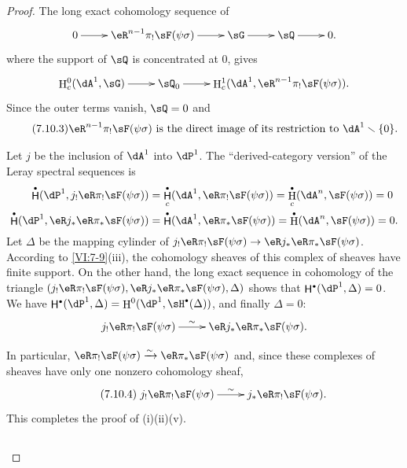 \documentclass[oneside]{book}
\DeclareMathOperator{\h}{H}
\DeclareMathOperator{\hh}{\mathsf{H}} %
\newcommand{\iso}{\xrightarrow\sim}
\renewcommand{\setminus}{\smallsetminus}
\theoremstyle{sga-source}
\theoremstyle{sga-source-dash}
\theoremstyle{sga-source-dotdash}
\theoremstyle{sga-source-number-note-dash}
\theoremstyle{sga-source-note-number-dotdash}
\theoremstyle{sga-source-example-dotdash}
\theoremstyle{sga-source-inline-number}
\theoremstyle{sga-source-bare-number}
\theoremstyle{sga-source}
\let\oldbullet\bullet
\renewcommand{\bullet}{\textnormal{\tiny$\oldbullet$}}
\newcommand{\PrintPage}[1]{}\newcommand{\MathPage}[1]{}\newcommand{\PrintCite}[2]{#1}\newcommand{\var}[3]{#2}
\begin{document}
\begin{proof}[Proof]
\PrintPage{223}
The long exact cohomology sequence of 
\[\xymatrix{
  0 \ar[r] 
    & \eR^{n-1} \pi_! \sF(\psi\sigma) \ar[r] 
    & \sG \ar[r] 
    & \sQ \ar[r] 
    & 0 \text{.} 
}\]
where the support of $\sQ$ is concentrated at $0$, gives 
\[\xymatrix{
  \h_c^0(\dA^1,\sG) \ar[r] 
    & \sQ_0 \ar[r] 
    & \h_c^1(\dA^1,\eR^{n-1} \pi_! \sF(\psi\sigma)) \text{.} 
}\]
Since the outer terms vanish, $\sQ=0$ and 
\begin{equation*}\tag{7.10.3}\label{VI:eq:7-10-3}
  \text{$\eR^{n-1} \pi_! \sF(\psi\sigma)$ is the direct image of its restriction to $\dA^1\setminus \{0\}$.}
\end{equation*}

Let $j$ be the inclusion of $\dA^1$ into $\dP^1$. The ``derived-category 
version'' of the Leray spectral sequences is 
\begin{align*}
  \hh^\bullet(\dP^1,j_! \eR\pi_! \sF(\psi\sigma)) &= \hh_c^\bullet(\dA^1,\eR \pi_! \sF(\psi\sigma)) = \h_c^\bullet(\dA^n,\sF(\psi\sigma)) = 0 \\
  \hh^\bullet(\dP^1,\eR j_\ast \eR \pi_\ast \sF(\psi\sigma)) &= \hh^\bullet(\dA^1,\eR \pi_\ast \sF(\psi\sigma)) = \h^\bullet(\dA^n,\sF(\psi\sigma)) = 0 \text{.}
\end{align*}
Let $\Delta$ be the mapping cylinder of 
$j_! \eR\pi_! \sF(\psi\sigma) \to \eR j_\ast \eR \pi_\ast \sF(\psi\sigma)$. 
According to \ref{VI:7-9}(iii), the cohomology sheaves of this complex of 
sheaves have finite support. On the other hand, the long exact sequence in 
cohomology of the triangle 
$(j_!\eR \pi_! \sF(\psi\sigma),\eR j_\ast \eR \pi_\ast \sF(\psi\sigma),\Delta)$ 
shows that $\hh^\bullet(\dP^1,\Delta)=0$. We have 
$\hh^\bullet(\dP^1,\Delta) = \h^0(\dP^1,\sH^\bullet(\Delta))$, and finally 
$\Delta=0$: 
\[\xymatrix{
  j_! \eR\pi_! \sF(\psi\sigma) \ar[r]^-\sim 
    & \eR j_\ast \eR \pi_\ast \sF(\psi\sigma) \text{.} 
}\]

In particular, $\eR\pi_! \sF(\psi\sigma)\iso \eR\pi_\ast \sF(\psi\sigma)$ and, 
since these complexes of sheaves have only one nonzero cohomology sheaf, 
\begin{equation*}\tag{7.10.4}\label{VI:eq:7-10-4}
\xymatrix{
  j_! \eR \pi_! \sF(\psi\sigma) \ar[r]^-\sim 
    & j_\ast \eR \pi_! \sF(\psi\sigma) \text{.} 
}
\end{equation*}
This completes the proof of (i)(ii)(v). 





\PrintPage{224}
\subsection{}\label{VI:7-11}


\end{proof}
\end{document}
